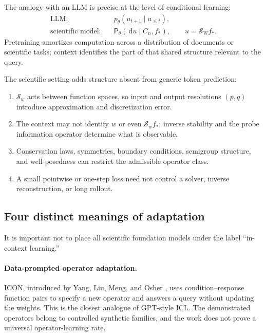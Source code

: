 \documentclass[11pt]{amsart}
\numberwithin{equation}{section}
\theoremstyle{definition}
\theoremstyle{plain}
\theoremstyle{remark}
\newcommand{\cS}{\mathcal{S}}
\newcommand{\dd}{\,\mathrm{d}}
\begin{document}
The analogy with an LLM is precise at the level of conditional learning:
\begin{equation}\label{eq:llm-science-comparison}
\begin{aligned}
\text{LLM:}\quad
&p_\theta(u_{t+1}\mid u_{\le t}),\\
\text{scientific model:}\quad
&\mathsf P_\theta(\dd u\mid C_n,f_*),
\qquad u=\cS_Wf_*.
\end{aligned}
\end{equation}
Pretraining amortizes computation across a distribution of documents or
scientific tasks; context identifies the part of that shared structure relevant
to the query.

The scientific setting adds structure absent from generic token prediction:
\begin{enumerate}[label=(\arabic*)]
\item $\cS_w$ acts between function spaces, so input and output resolutions
$(p,q)$ introduce approximation and discretization error.
\item The context may not identify $w$ or even $\cS_wf_*$; inverse stability and
the probe information operator determine what is observable.
\item Conservation laws, symmetries, boundary conditions, semigroup structure,
and well-posedness can restrict the admissible operator class.
\item A small pointwise or one-step loss need not control a solver, inverse
reconstruction, or long rollout.
\end{enumerate}

\subsection{Four distinct meanings of adaptation}

It is important not to place all scientific foundation models under the label
``in-context learning.''

\paragraph{\textbf{Data-prompted operator adaptation.}}
ICON, introduced by Yang, Liu, Meng, and Osher
\cite{YangEtAl2023ICON}, uses condition--response function pairs to specify a
new operator and answers a query without updating the weights.  This is the
closest analogue of GPT-style ICL.  The demonstrated operators belong to
controlled synthetic families, and the work does not prove a universal
operator-learning rate.
\end{document}
